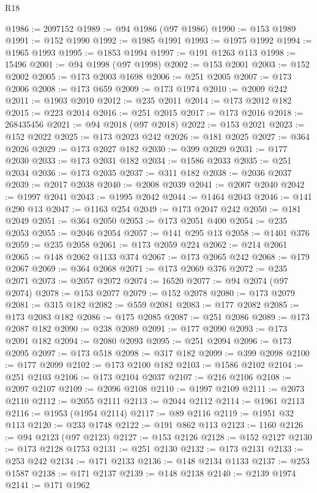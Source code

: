 \begin{lexlean}{R18}
\begin{coremodule}
@1986 := 2097152
@1989 := @94 @1986 (@97 @1986)
@1990 := @153 @1989
@1991 := @152 @1990
@1992 := @1985 @1991
@1993 := @1975 @1992
@1994 := @1965 @1993
@1995 := @1853 @1994
@1997 := @191 @1263 @113
@1998 := 15496
@2001 := @94 @1998 (@97 @1998)
@2002 := @153 @2001
@2003 := @152 @2002
@2005 := @173 @2003 @1698
@2006 := @251 @2005
@2007 := @173 @2006
@2008 := @173 @659
@2009 := @173 @1974
@2010 := @2009 @242
@2011 := @1903 @2010
@2012 := @235 @2011
@2014 := @173 @2012 @182
@2015 := @223 @2014
@2016 := @251 @2015
@2017 := @173 @2016
@2018 := 268435456
@2021 := @94 @2018 (@97 @2018)
@2022 := @153 @2021
@2023 := @152 @2022
@2025 := @173 @2023 @242
@2026 := @181 @2025
@2027 := @364 @2026
@2029 := @173 @2027 @182
@2030 := @399 @2029
@2031 := @177 @2030
@2033 := @173 @2031 @182
@2034 := @1586 @2033
@2035 := @251 @2034
@2036 := @173 @2035
@2037 := @311 @182
@2038 := @2036 @2037
@2039 := @2017 @2038
@2040 := @2008 @2039
@2041 := @2007 @2040
@2042 := @1997 @2041
@2043 := @1995 @2042
@2044 := @1464 @2043
@2046 := @141 @290 @13
@2047 := @1163 @254
@2049 := @173 @2047 @242
@2050 := @181 @2049
@2051 := @364 @2050
@2053 := @173 @2051 @400
@2054 := @235 @2053
@2055 := @2046 @2054
@2057 := @141 @295 @13
@2058 := @1401 @376
@2059 := @235 @2058
@2061 := @173 @2059 @224
@2062 := @214 @2061
@2065 := @148 @2062 @1133 @374
@2067 := @173 @2065 @242
@2068 := @179 @2067
@2069 := @364 @2068
@2071 := @173 @2069 @376
@2072 := @235 @2071
@2073 := @2057 @2072
@2074 := 16520
@2077 := @94 @2074 (@97 @2074)
@2078 := @153 @2077
@2079 := @152 @2078
@2080 := @173 @2079
@2081 := @315 @182
@2082 := @559 @2081
@2083 := @177 @2082
@2085 := @173 @2083 @182
@2086 := @175 @2085
@2087 := @251 @2086
@2089 := @173 @2087 @182
@2090 := @238 @2089
@2091 := @177 @2090
@2093 := @173 @2091 @182
@2094 := @2080 @2093
@2095 := @251 @2094
@2096 := @173 @2095
@2097 := @173 @518
@2098 := @317 @182
@2099 := @399 @2098
@2100 := @177 @2099
@2102 := @173 @2100 @182
@2103 := @1586 @2102
@2104 := @251 @2103
@2106 := @173 @2104 @2037
@2107 := @216 @2106
@2108 := @2097 @2107
@2109 := @2096 @2108
@2110 := @1997 @2109
@2111 := @2073 @2110
@2112 := @2055 @2111
@2113 := @2044 @2112
@2114 := @1961 @2113
@2116 := @1953 (@1954 @2114)
@2117 := @89 @2116
@2119 := @1951 @32 @113
@2120 := @233 @1748
@2122 := @191 @862 @113
@2123 := 1160
@2126 := @94 @2123 (@97 @2123)
@2127 := @153 @2126
@2128 := @152 @2127
@2130 := @173 @2128 @1753
@2131 := @251 @2130
@2132 := @173 @2131
@2133 := @253 @242
@2134 := @171 @2133
@2136 := @148 @2134 @1133
@2137 := @253 @1587
@2138 := @171 @2137
@2139 := @148 @2138
@2140 := @2139 @1974
@2141 := @171 @1962

\end{coremodule}
\end{lexlean}

